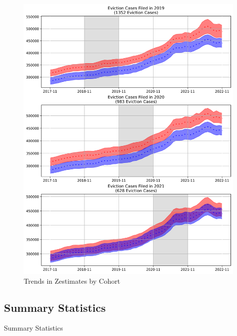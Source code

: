 \documentclass[12pt]{article}
\begin{document}
        \begin{figure}[H]
            \centering
            \includegraphics[scale=0.8]{output/DiD/figures/trends_in_zestimates_by_cohort.png}
            \caption{Trends in Zestimates by Cohort}
            \label{fig:my_label}
        \end{figure}

    \subsection{Summary Statistics}
         \begin{table}[H]
            \centering
            \small
            
            \caption{Summary Statistics}
            \label{tab:table_1}
        \end{table}
        \newpage


    
\end{document}
